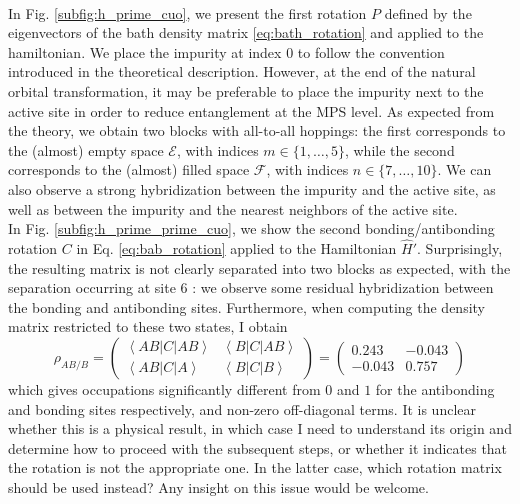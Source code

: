 \documentclass[11pt]{article}
\newcommand{\hamiltonian}{\hat{H}}
\newcommand{\ket}[1]{\left| {#1} \right>}
\newcommand{\bra}[1]{\left< {#1} \right|}
\begin{document}
\\In Fig. \ref{subfig:h_prime_cuo}, we present the first rotation $P$ defined by the eigenvectors of the bath density matrix \eqref{eq:bath_rotation} and applied to the hamiltonian. We place the impurity at index $0$ to follow the convention introduced in the theoretical description. However, at the end of the natural orbital transformation, it may be preferable to place the impurity next to the active site in order to reduce entanglement at the MPS level. As expected from the theory, we obtain two blocks with all-to-all hoppings: the first corresponds to the (almost) empty space $\mathcal{E}$, with indices $m\in\{1, \ldots, 5\}$, while the second corresponds to the (almost) filled space $\mathcal{F}$, with indices $n\in\{7,\ldots, 10\}$. We can also observe a strong hybridization between the impurity and the active site, as well as between the impurity and the nearest neighbors of the active site.\\
In Fig. \ref{subfig:h_prime_prime_cuo}, we show the second bonding/antibonding rotation $C$ in Eq. \ref{eq:bab_rotation} applied to the Hamiltonian $\hamiltonian'$. Surprisingly, the resulting matrix is not clearly separated into two blocks as expected, with the separation occurring at site $6$ : we observe some residual hybridization between the bonding and antibonding sites. Furthermore, when computing the density matrix restricted to these two states, I obtain
\begin{equation}
\rho_{AB/B} =
\begin{pmatrix}
\bra{AB} C \ket{AB} & \bra{B} C \ket{AB} \\
\bra{AB} C \ket{A} & \bra{B} C \ket{B}
\end{pmatrix}
=
\begin{pmatrix}
0.243 & -0.043 \\
-0.043 & 0.757
\end{pmatrix}
\end{equation}
which gives occupations significantly different from $0$ and $1$ for the antibonding and bonding sites respectively, and non-zero off-diagonal terms. It is unclear whether this is a physical result, in which case I need to understand its origin and determine how to proceed with the subsequent steps, or whether it indicates that the rotation is not the appropriate one. In the latter case, which rotation matrix should be used instead? Any insight on this issue would be welcome.\\
\end{document}
